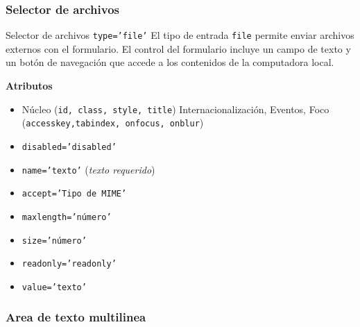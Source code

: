 \documentclass{beamer}
\begin{document}
\subsubsection{Selector de archivos}
\begin{frame}{Selector de archivos \texttt{type='file'}} %
    El tipo de entrada \texttt{file} permite enviar archivos externos con el
    formulario. El control del formulario incluye un campo de texto y un botón
    de navegación que accede a los contenidos de la computadora local.\\ 
    
    \footnotesize{
    \textbf{Atributos}
    \begin{itemize}
        \item Núcleo (\texttt{id, class, style, title}) Internacionalización,
        Eventos, Foco (\texttt{accesskey,tabindex, onfocus, onblur})
        \item \texttt{disabled='disabled'}
        \item \texttt{name='texto'} (\textit{texto requerido})
        \item \texttt{accept='Tipo de MIME'}
        \item \texttt{maxlength='número'}
        \item \texttt{size='número'}
        \item \texttt{readonly='readonly'}
        \item \texttt{value='texto'}
    \end{itemize}
    }
\end{frame}

\subsubsection{Area de texto multilinea} 
\end{document}
